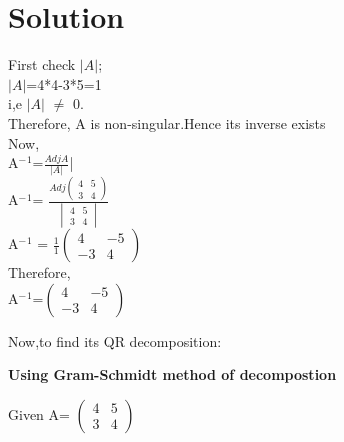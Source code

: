 \documentclass[a4paper,12pt]{article}
\begin{document}
\section*{\small Solution}

First check $|A|$;\\

$|A|$=4*4-3*5=1\\

i,e $|A|$ $\not=$ 0.\\

Therefore, A is non-singular.Hence its inverse exists\\

Now,\\

A$^-$$^1$=$\frac{Adj A}{|A|}$|\\

A$^-$$^1$= $\frac{ Adj\begin{pmatrix} 4 & 5  \\ 3 & 4 \end{pmatrix} }{\begin{vmatrix} 4 & 5  \\ 3 & 4 \end{vmatrix}}$\\


A$^-$$^1$ = $\frac{1}{1}$$\begin{pmatrix} 4 & -5  \\ -3 & 4 \end{pmatrix}$\\
         
Therefore,\\
         
A$^-$$^1$=$\begin{pmatrix} 4 & -5  \\ -3 & 4 \end{pmatrix}$\\

\vspace{0.5cm}

Now,to find its QR decomposition:\\

\vspace{0.5cm}

\textbf{Using Gram-Schmidt method of decompostion}\\

\vspace{0.5cm}

Given  A= $\begin{pmatrix} 4 & 5  \\ 3 & 4 \end{pmatrix}$\\
\end{document}
